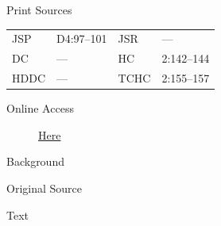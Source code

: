 			\begin{description}
					\item[Print Sources]
				\end{description}

					\begin{tabular}{p{0.5in}p{1in}p{0.5in}p{1in}}
					JSP	 	& D4:97--101		& JSR 		& --- \\
					DC	 	& --- 		& HC 		& 2:142--144 \\
					HDDC 	& ---		& TCHC 		& 2:155--157 \\
					\end{tabular}
				
				\begin{description}
					\item[Online Access] \href{https://www.josephsmithpapers.org/paper-summary/minutes-11-august-1834/1}{Here}
				\end{description}
				
				\begin{description}
					\item[Background]
				\end{description}
				
				
				\begin{description}
					\item[Original Source]
				\end{description}
				
				
				\begin{description}
					\item[Text]
				\end{description}
				

